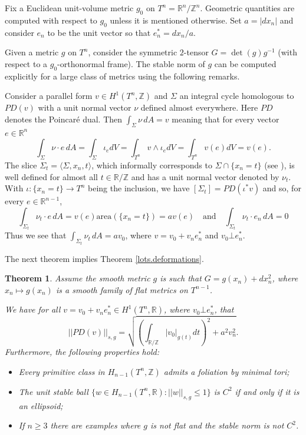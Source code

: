 \documentclass[11pt]{amsart}
\def\R{\mathbb R}
\def\Z{\mathbb Z}
\def\area{\mathrm{area}}
\newtheorem{thm}{Theorem}[section]
\theoremstyle{remark}
\theoremstyle{definition}
\begin{document}
	{Fix a Euclidean unit-volume metric $g_0$ on  $T^n=\R^n/\Z^n$. Geometric quantities are computed with respect to $g_0$ unless it is mentioned otherwise.  Set $a=|dx_n|$ and consider $e_n$ to be the unit vector so that $e_n^*=dx_n/a$.
		
		
		Given a metric $g$ on $T^n$, consider the symmetric $2$-tensor $G=\det(g)g^{-1}$ (with respect to a $g_0$-orthonormal frame). The stable norm of $g$ can be computed explicitly for a large class of metrics using the following remarks.
		
		Consider a parallel form $v\in H^1(T^n,\Z)$ and $\Sigma$ an integral cycle homologous to $PD(v)$  with a unit normal vector $\nu$ defined almost everywhere. {Here $PD$ denotes the Poincar\'e dual.} Then $\int_{\Sigma}\nu\, dA=v$ meaning that for every vector $e\in\R^n$
		$$\int_{\Sigma}\nu\cdot e\, dA=\int_{\Sigma}\iota_e dV=\int_{T^n}v\wedge \iota_e dV= \int_{T^n}v(e) dV=v(e).$$
		The slice $\Sigma_t=\langle\Sigma,x_n,t\rangle$, which informally corresponds to $\Sigma\cap\{x_n=t\}$ (see \cite[Section 6.4]{leon}), is well defined for almost all $t\in \R/\Z$ and has a  unit normal vector denoted by $\nu_t$. With $\iota:\{x_n=t\}\rightarrow T^n$ being the inclusion, we have $[\Sigma_t]=PD(\iota^*v)$ and so, for every  $e\in\R^{n-1}$,
		$$\int_{\Sigma_t}\nu_t\cdot e\, dA=v(e)\area(\{x_n=t\})=av(e)\quad\text{and}\quad\int_{\Sigma_t}\nu_t\cdot e_n\, dA=0$$
		Thus we see that $\int_{\Sigma_t}\nu_t\, dA=av_0$, where $v=v_0+v_ne_n^*$ and $v_0\bot e_n^*$. 
		
		The next theorem implies Theorem \ref{lots.deformations}.
		\begin{thm}\label{stable.warp} Assume the  smooth metric $g$ is such that $G=g(x_n)+dx_n^2$, where $x_n\mapsto g(x_n)$ is  a smooth family of flat metrics on $T^{n-1}$.
			
			We have for all $v=v_0+v_ne_n^*\in H^1(T^n,\R)$, where $v_0\bot e_n^*$, that
			$$
			||PD(v)||_{s,g}=\sqrt{\left(\int_{\R/\Z}|v_0|_{g(t)}dt\right)^{2}+a^2v_n^2}.
			$$
			Furthermore, the following properties hold:
			\begin{itemize}
				\item[(i)] Every primitive class in $H_{n-1}(T^n,\Z)$ admits a foliation by minimal tori;
				\item[(ii)] The unit stable ball $\{w\in H_{n-1}(T^n,\R):||w||_{s,g}\leq 1\}$ is $C^2$ if and only if it is an ellipsoid;
				\item[(iii)] If $n\geq 3$ there are examples where $g$ is not flat and the stable norm is not $C^2$.
			\end{itemize}
	\end{thm}}
\end{document}
